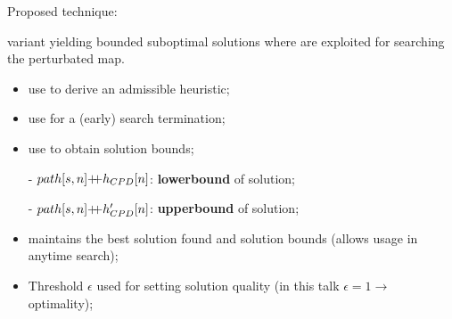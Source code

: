 \begin{frame}{Proposed technique: \CPDSearch{}}
    \begin{block}{\CPDSearch{}}
        \A{} variant yielding bounded suboptimal solutions where \CPDPathsName{} are exploited for searching the perturbated map.
    \end{block}

    \begin{itemize}
        \item {\color{gray}use \CPD{} to derive an admissible heuristic;}
        \item {\color{gray}use \CPD{} for a (early) search termination;}
        \item {use \CPD{} to obtain solution bounds;}
    \end{itemize}

    \begin{itemize}
        \item[-] $\pathOnGraph{s}{n} \doublePlus{} \CPDPathCostOriginal{n}{t}$: \textbf{lowerbound} of solution;
        \item[-] $\pathOnGraph{s}{n} \doublePlus{} \CPDPathCostNew{n}{t}$: \textbf{upperbound} of solution;
    \end{itemize}

    \begin{block}{}
        \begin{itemize}
            \item \CPDSearch{} maintains the best solution found and solution bounds (allows usage in anytime search);
            \item Threshold $\epsilon$ used for setting \CPDSearch{} solution quality (in this talk $\epsilon = 1 \rightarrow $ optimality);
        \end{itemize}
    \end{block}

\end{frame}

